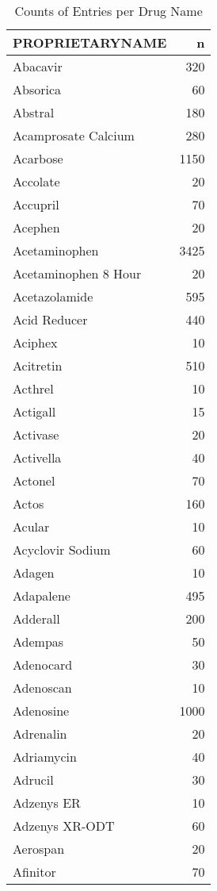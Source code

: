 \documentclass[
]{article}
\begin{document}
\begin{table}

\caption{\label{tab:unnamed-chunk-5}Counts of Entries per Drug Name}
\centering
\begin{tabular}[t]{l|r}
\hline
PROPRIETARYNAME & n\\
\hline
Abacavir & 320\\
\hline
Absorica & 60\\
\hline
Abstral & 180\\
\hline
Acamprosate Calcium & 280\\
\hline
Acarbose & 1150\\
\hline
Accolate & 20\\
\hline
Accupril & 70\\
\hline
Acephen & 20\\
\hline
Acetaminophen & 3425\\
\hline
Acetaminophen 8 Hour & 20\\
\hline
Acetazolamide & 595\\
\hline
Acid Reducer & 440\\
\hline
Aciphex & 10\\
\hline
Acitretin & 510\\
\hline
Acthrel & 10\\
\hline
Actigall & 15\\
\hline
Activase & 20\\
\hline
Activella & 40\\
\hline
Actonel & 70\\
\hline
Actos & 160\\
\hline
Acular & 10\\
\hline
Acyclovir Sodium & 60\\
\hline
Adagen & 10\\
\hline
Adapalene & 495\\
\hline
Adderall & 200\\
\hline
Adempas & 50\\
\hline
Adenocard & 30\\
\hline
Adenoscan & 10\\
\hline
Adenosine & 1000\\
\hline
Adrenalin & 20\\
\hline
Adriamycin & 40\\
\hline
Adrucil & 30\\
\hline
Adzenys ER & 10\\
\hline
Adzenys XR-ODT & 60\\
\hline
Aerospan & 20\\
\hline
Afinitor & 70\\

\end{tabular}
\end{table}
\end{document}
